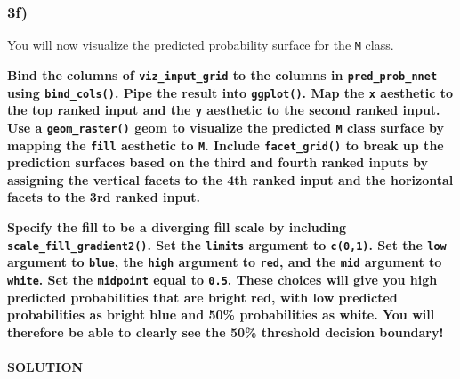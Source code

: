 \documentclass[
]{article}
\begin{document}
\hypertarget{f-1}{%
\subsubsection{3f)}\label{f-1}}

You will now visualize the predicted probability surface for the
\texttt{M} class.

\textbf{Bind the columns of \texttt{viz\_input\_grid} to the columns in
\texttt{pred\_prob\_nnet} using \texttt{bind\_cols()}. Pipe the result
into \texttt{ggplot()}. Map the \texttt{x} aesthetic to the top ranked
input and the \texttt{y} aesthetic to the second ranked input. Use a
\texttt{geom\_raster()} geom to visualize the predicted \texttt{M} class
surface by mapping the \texttt{fill} aesthetic to \texttt{M}. Include
\texttt{facet\_grid()} to break up the prediction surfaces based on the
third and fourth ranked inputs by assigning the vertical facets to the
4th ranked input and the horizontal facets to the 3rd ranked input.}

\textbf{Specify the fill to be a diverging fill scale by including
\texttt{scale\_fill\_gradient2()}. Set the \texttt{limits} argument to
\texttt{c(0,1)}. Set the \texttt{low} argument to
\texttt{\textquotesingle{}blue\textquotesingle{}}, the \texttt{high}
argument to \texttt{\textquotesingle{}red\textquotesingle{}}, and the
\texttt{mid} argument to
\texttt{\textquotesingle{}white\textquotesingle{}}. Set the
\texttt{midpoint} equal to \texttt{0.5}. These choices will give you
high predicted probabilities that are bright red, with low predicted
probabilities as bright blue and 50\% probabilities as white. You will
therefore be able to clearly see the 50\% threshold decision boundary!}

\hypertarget{solution-16}{%
\paragraph{SOLUTION}\label{solution-16}}
\end{document}
